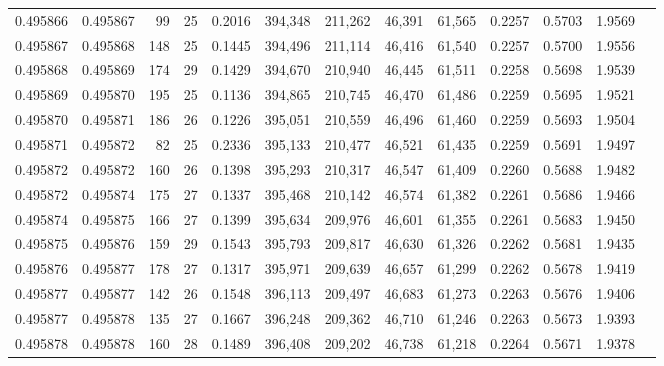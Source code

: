 \begin{tabular}{rrrrrrrrrrrrr}
0.495866 & 0.495867 &  99 &  25 &                                     0.2016 & 394,348 & 211,262 &  46,391 &  61,565 & 0.2257 & 0.5703 & 1.9569 \\
0.495867 & 0.495868 & 148 &  25 &                                     0.1445 & 394,496 & 211,114 &  46,416 &  61,540 & 0.2257 & 0.5700 & 1.9556 \\
0.495868 & 0.495869 & 174 &  29 &                                     0.1429 & 394,670 & 210,940 &  46,445 &  61,511 & 0.2258 & 0.5698 & 1.9539 \\
0.495869 & 0.495870 & 195 &  25 &                                     0.1136 & 394,865 & 210,745 &  46,470 &  61,486 & 0.2259 & 0.5695 & 1.9521 \\
0.495870 & 0.495871 & 186 &  26 &                                     0.1226 & 395,051 & 210,559 &  46,496 &  61,460 & 0.2259 & 0.5693 & 1.9504 \\
0.495871 & 0.495872 &  82 &  25 &                                     0.2336 & 395,133 & 210,477 &  46,521 &  61,435 & 0.2259 & 0.5691 & 1.9497 \\
0.495872 & 0.495872 & 160 &  26 &                                     0.1398 & 395,293 & 210,317 &  46,547 &  61,409 & 0.2260 & 0.5688 & 1.9482 \\
0.495872 & 0.495874 & 175 &  27 &                                     0.1337 & 395,468 & 210,142 &  46,574 &  61,382 & 0.2261 & 0.5686 & 1.9466 \\
0.495874 & 0.495875 & 166 &  27 &                                     0.1399 & 395,634 & 209,976 &  46,601 &  61,355 & 0.2261 & 0.5683 & 1.9450 \\
0.495875 & 0.495876 & 159 &  29 &                                     0.1543 & 395,793 & 209,817 &  46,630 &  61,326 & 0.2262 & 0.5681 & 1.9435 \\
0.495876 & 0.495877 & 178 &  27 &                                     0.1317 & 395,971 & 209,639 &  46,657 &  61,299 & 0.2262 & 0.5678 & 1.9419 \\
0.495877 & 0.495877 & 142 &  26 &                                     0.1548 & 396,113 & 209,497 &  46,683 &  61,273 & 0.2263 & 0.5676 & 1.9406 \\
0.495877 & 0.495878 & 135 &  27 &                                     0.1667 & 396,248 & 209,362 &  46,710 &  61,246 & 0.2263 & 0.5673 & 1.9393 \\
0.495878 & 0.495878 & 160 &  28 &                                     0.1489 & 396,408 & 209,202 &  46,738 &  61,218 & 0.2264 & 0.5671 & 1.9378 \\

\end{tabular}
